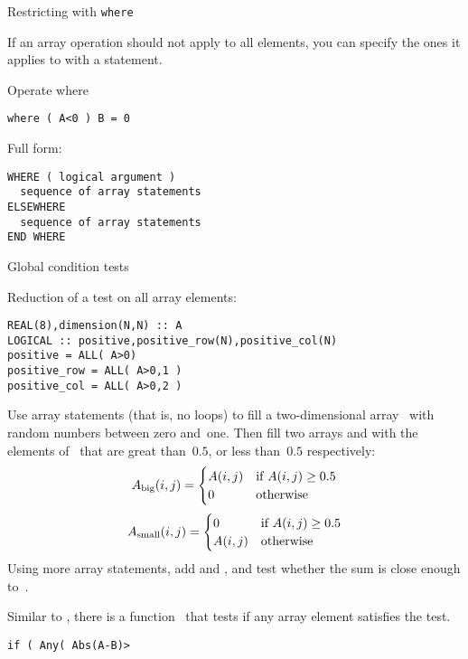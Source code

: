  {Restricting with \tt{where}}

If an array operation should not apply to all elements, you can
specify the ones it applies to with a  statement.

\begin{block}{Operate where}
  \label{sl:farray-where}
\begin{verbatim}
where ( A<0 ) B = 0
\end{verbatim}

Full form:
\begin{verbatim}
WHERE ( logical argument )
  sequence of array statements
ELSEWHERE
  sequence of array statements
END WHERE
\end{verbatim}
\end{block}

 {Global condition tests}

Reduction of a test on all array elements:
\begin{verbatim}
REAL(8),dimension(N,N) :: A
LOGICAL :: positive,positive_row(N),positive_col(N)
positive = ALL( A>0)
positive_row = ALL( A>0,1 )
positive_col = ALL( A>0,2 )
\end{verbatim}

\begin{exercise}
  Use array statements (that is, no loops) to fill a two-dimensional
  array~ with random numbers between zero and~one. Then fill two
  arrays  and  with the elements of~ that are
  great than~$0.5$, or less than~$0.5$ respectively:
  \[ A_{\scriptstyle\mathrm{big}}(i,j) =
  \begin{cases}
    A(i,j)&\hbox{if $A(i,j)\geq 0.5$}\\ 0&\hbox{otherwise}
  \end{cases}
  \]
  \[ A_{\scriptstyle\mathrm{small}}(i,j) =
  \begin{cases}
    0&\hbox{if $A(i,j)\geq 0.5$}\\ A(i,j)&\hbox{otherwise}
  \end{cases}
  \]
  Using more array statements, add  and , and test
  whether the sum is close enough to~.
\end{exercise}

Similar to , there is a function~ that tests
if any array element satisfies the test.
\begin{verbatim}
if ( Any( Abs(A-B)>
\end{verbatim}

